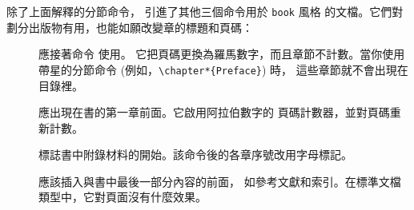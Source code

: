 除了上面解釋的分節命令，\LaTeXe{} 引進了其他三個命令用於 \verb|book| 風格
的文檔。它們對劃分出版物有用，也能如願改變章的標題和頁碼：
\begin{description}
\item[] 應接著命令 \verb|| 使用。
     它把頁碼更換為羅馬數字，而且章節不計數。當你使用帶星的分節命令 (例如，\verb|\chapter*{Preface}|) 時，
     這些章節就不會出現在目錄裡。
\item[] 應出現在書的第一章前面。它啟用阿拉伯數字的
     頁碼計數器，並對頁碼重新計數。
\item[] 標誌書中附錄材料的開始。該命令後的各章序號改用字母標記。
\item[] 應該插入與書中最後一部分內容的前面，
     如參考文獻和索引。在標準文檔類型中，它對頁面沒有什麼效果。
\end{description}



